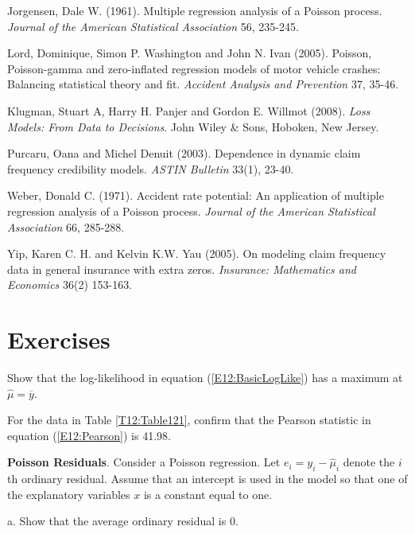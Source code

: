 {\begin{multicols}{2}
Jorgensen, Dale W. (1961). Multiple regression analysis of a Poisson
process.  \textit{Journal of the American Statistical Association}
56, 235-245.

Lord, Dominique, Simon P. Washington and John N. Ivan (2005).
Poisson, Poisson-gamma and zero-inflated regression models of motor
vehicle crashes: Balancing statistical theory and fit.
\textit{Accident Analysis and Prevention} 37, 35-46.

Klugman, Stuart A, Harry H. Panjer and Gordon E. Willmot (2008).
\emph{Loss Models: From Data to Decisions}. John Wiley \& Sons,
Hoboken, New Jersey.

Purcaru, Oana and Michel Denuit (2003). Dependence in dynamic claim
frequency credibility models. \textit{ASTIN Bulletin} 33(1), 23-40.

Weber, Donald C. (1971). Accident rate potential: An application of
multiple regression analysis of a Poisson process. \textit{Journal
of the American Statistical Association} 66, 285-288.

Yip, Karen C. H. and Kelvin K.W. Yau (2005). On modeling claim frequency
data in general insurance with extra zeros. \textit{Insurance: Mathematics
and Economics }36(2) 153-163.


\end{multicols}



\section{Exercises}

\begin{exercises}


\item  Show that the log-likelihood in equation (\ref{E12:BasicLogLike})
has a maximum at $ \widehat{\mu }=\overline{y}$.

\item  For the data in Table \ref{T12:Table121}, confirm that the
Pearson statistic in equation (\ref{E12:Pearson}) is 41.98.

\item \textbf{Poisson Residuals}. Consider a Poisson regression. Let $e_i
= y_i - \widehat{\mu}_i$ denote the $i$th ordinary residual. Assume
that an intercept is used in the model so that one of the
explanatory variables $x$ is a constant equal to one.

a. Show that the average ordinary residual is 0.


\end{exercises}}
